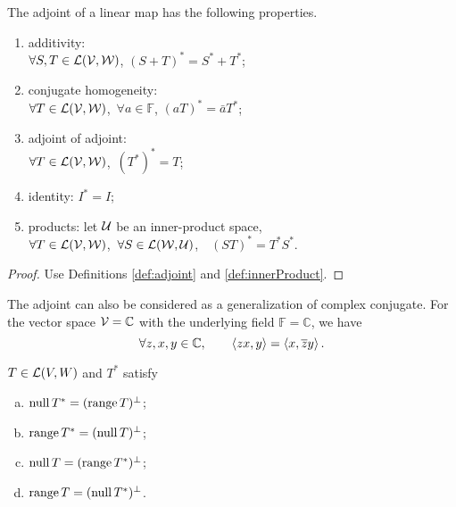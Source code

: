 \begin{thm}
  \label{thm:adjointProperties}
  The adjoint of a linear map has the following properties.
  \begin{enumerate}[({ADJ}-1)]\itemsep0em
  \item additivity:\\
    $\forall S,T\in {\cal L}({\cal V},{\cal W})$,\qquad
    $(S+T)^*=S^*+T^*$;
  \item conjugate homogeneity:\\
    $\forall T\in {\cal L}({\cal V},{\cal W})$,\ 
    $\forall a\in \mathbb{F}$,\qquad
    $(aT)^*=\bar{a}T^*$;
  \item adjoint of adjoint:\\
    $\forall T\in {\cal L}({\cal V},{\cal W})$,\ 
    $(T^*)^*=T$;
  \item identity: $I^*=I$;
  \item products:
    let ${\cal U}$ be an inner-product space,\\
    $\forall T\in {\cal L}({\cal V},{\cal W})$,\ 
    $\forall S\in {\cal L}({\cal W},{\cal U})$,\ \ 
    $(ST)^*=T^*S^*$.
  \end{enumerate}
\end{thm}
\begin{proof}
  Use Definitions \ref{def:adjoint}
  and \ref{def:innerProduct}.
\end{proof}

\begin{rem}
  \label{rem:adjointGeneralizesComplexConjugate}
  The adjoint can also be considered
  as a generalization of complex conjugate.
  For the vector space ${\cal V}=\mathbb{C}$
  with the underlying field $\mathbb{F}=\mathbb{C}$,
  we have
  \begin{displaymath}
    \forall z, x, y\in \mathbb{C},\qquad
    \left\langle zx,y \right\rangle=\left\langle x,\overline{z}y \right\rangle.
  \end{displaymath}
\end{rem}

\begin{lem}
  $T\in {\cal L}(V,W)$ and $T^*$ satisfy
  \begin{enumerate}[(a)]\itemsep0em
  \item $\mathrm{null}\,T^* = (\mathrm{range}\,T)^{\perp}$;
  \item $\mathrm{range}\,T^* = (\mathrm{null}\,T)^{\perp}$;
  \item $\mathrm{null}\,T = (\mathrm{range}\,T^*)^{\perp}$;
  \item $\mathrm{range}\,T = (\mathrm{null}\,T^*)^{\perp}$.
  \end{enumerate}
\end{lem}


